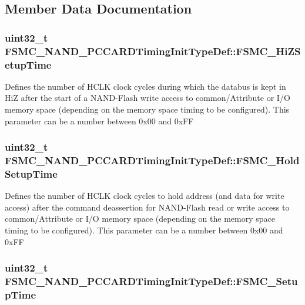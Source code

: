 \subsection{Member Data Documentation}
\hypertarget{structFSMC__NAND__PCCARDTimingInitTypeDef_a8a2a2a9e71dbf276fddad2bb32c0d256}{
\subsubsection[{FSMC\_\-HiZSetupTime}]{\setlength{\rightskip}{0pt plus 5cm}uint32\_\-t {\bf FSMC\_\-NAND\_\-PCCARDTimingInitTypeDef::FSMC\_\-HiZSetupTime}}}
\label{structFSMC__NAND__PCCARDTimingInitTypeDef_a8a2a2a9e71dbf276fddad2bb32c0d256}
Defines the number of HCLK clock cycles during which the databus is kept in HiZ after the start of a NAND-\/Flash write access to common/Attribute or I/O memory space (depending on the memory space timing to be configured). This parameter can be a number between 0x00 and 0xFF \hypertarget{structFSMC__NAND__PCCARDTimingInitTypeDef_ae2b53c2cfd55ff277f453613dcf7c8b2}{
\subsubsection[{FSMC\_\-HoldSetupTime}]{\setlength{\rightskip}{0pt plus 5cm}uint32\_\-t {\bf FSMC\_\-NAND\_\-PCCARDTimingInitTypeDef::FSMC\_\-HoldSetupTime}}}
\label{structFSMC__NAND__PCCARDTimingInitTypeDef_ae2b53c2cfd55ff277f453613dcf7c8b2}
Defines the number of HCLK clock cycles to hold address (and data for write access) after the command deassertion for NAND-\/Flash read or write access to common/Attribute or I/O memory space (depending on the memory space timing to be configured). This parameter can be a number between 0x00 and 0xFF \hypertarget{structFSMC__NAND__PCCARDTimingInitTypeDef_a31632aeb49269a29a39e3b191590b6dc}{
\subsubsection[{FSMC\_\-SetupTime}]{\setlength{\rightskip}{0pt plus 5cm}uint32\_\-t {\bf FSMC\_\-NAND\_\-PCCARDTimingInitTypeDef::FSMC\_\-SetupTime}}}
